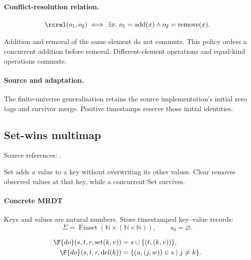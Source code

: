 \paragraph{Conflict-resolution relation.}
\[
\rcrel(o_1,o_2)\iff\exists x.\ o_1=\mathrm{add}(x)\land o_2=\mathrm{remove}(x).
\]

Addition and removal of the same element do not commute. This policy orders a concurrent addition before removal. Different-element operations and equal-kind operations commute.


\paragraph{Source and adaptation.}
The finite-universe generalisation retains the source implementation's initial zero tags and survivor merge. Positive timestamps reserve those initial identities.


\subsection{Set-wins multimap}
\label{app:dt-set-wins-map}

\noindent Source references: \cite{neem}.





Set adds a value to a key without overwriting its other values. Clear removes observed values at that key, while a concurrent Set survives.

\paragraph{Concrete MRDT}
Keys and values are natural numbers. Store timestamped key–value records:
\[
\Sigma=\operatorname{Finset}(\mathbb N\times(\mathbb N\times\mathbb N)),\qquad s_0=\varnothing.
\]

\[
\begin{aligned}
\F{do}(s,t,r,\mathrm{set}(k,v))&=s\cup\{(t,(k,v))\},\\
\F{do}(s,t,r,\mathrm{del}(k))&=\{(u,(j,w))\in s\mid j\ne k\}.
\end{aligned}
\]

